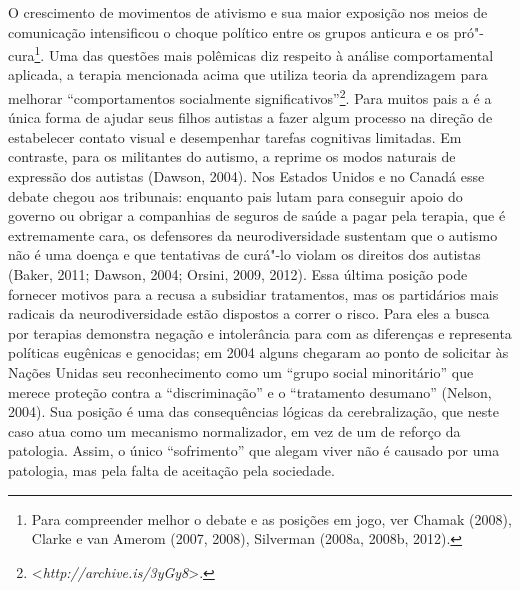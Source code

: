 O crescimento de movimentos de ativismo e sua maior exposição nos meios
de comunicação intensificou o choque político entre os grupos anticura e
os pró"-cura\footnote[13]{Para compreender melhor o debate e as posições em jogo, ver Chamak
(2008), Clarke e van Amerom (2007, 2008), Silverman (2008a, 2008b,
2012).}. Uma das questões mais polêmicas diz
respeito à análise comportamental aplicada, a terapia mencionada acima
que utiliza teoria da aprendizagem para melhorar ``comportamentos
socialmente significativos''\footnote[14]{\textless{}\emph{http://archive.is/3yGy8}\textgreater{}.}. Para muitos pais a 
é a única forma de ajudar seus filhos autistas a fazer algum processo na
direção de estabelecer contato visual e desempenhar tarefas cognitivas
limitadas. Em contraste, para os militantes do autismo, a  reprime os
modos naturais de expressão dos autistas (Dawson, 2004). Nos Estados
Unidos e no Canadá esse debate chegou aos tribunais: enquanto pais lutam
para conseguir apoio do governo ou obrigar a companhias de seguros de
saúde a pagar pela terapia, que é extremamente cara, os defensores da
neurodiversidade sustentam que o autismo não é uma doença e que
tentativas de curá"-lo violam os direitos dos autistas (Baker, 2011;
Dawson, 2004; Orsini, 2009, 2012). Essa última posição pode fornecer
motivos para a recusa a subsidiar tratamentos, mas os partidários mais
radicais da neurodiversidade estão dispostos a correr o risco. Para eles
a busca por terapias demonstra negação e intolerância para com as
diferenças e representa políticas eugênicas e genocidas; em 2004 alguns
chegaram ao ponto de solicitar às Nações Unidas seu reconhecimento como
um ``grupo social minoritário'' que merece proteção contra a
``discriminação'' e o ``tratamento desumano'' (Nelson, 2004). Sua
posição é uma das consequências lógicas da cerebralização, que neste
caso atua como um mecanismo normalizador, em vez de um de reforço da
patologia. Assim, o único ``sofrimento'' que alegam viver não é causado
por uma patologia, mas pela falta de aceitação pela sociedade.

